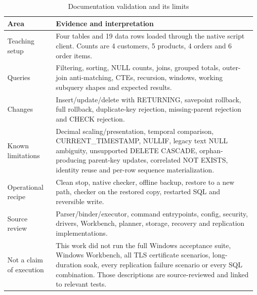\begin{longtable}{p{.29\linewidth}p{.63\linewidth}}
\caption{Documentation validation and its limits}\\
\toprule Area & Evidence and interpretation\\\midrule\endhead
Teaching setup & Four tables and 19 data rows loaded through the native script client. Counts are 4 customers, 5 products, 4 orders and 6 order items.\\
Queries & Filtering, sorting, NULL counts, joins, grouped totals, outer-join anti-matching, CTEs, recursion, windows, working subquery shapes and expected results.\\
Changes & Insert/update/delete with RETURNING, savepoint rollback, full rollback, duplicate-key rejection, missing-parent rejection and CHECK rejection.\\
Known limitations & Decimal scaling/presentation, temporal comparison, CURRENT\_TIMESTAMP, NULLIF, legacy text NULL ambiguity, unsupported DELETE CASCADE, orphan-producing parent-key updates, correlated NOT EXISTS, identity reuse and per-row sequence materialization.\\
Operational recipe & Clean stop, native checker, offline backup, restore to a new path, checker on the restored copy, restarted SQL and reversible write.\\
Source review & Parser/binder/executor, command entrypoints, config, security, drivers, Workbench, planner, storage, recovery and replication implementations.\\
Not a claim of execution & This work did not run the full Windows acceptance suite, Windows Workbench, all TLS certificate scenarios, long-duration soak, every replication failure scenario or every SQL combination. Those descriptions are source-reviewed and linked to relevant tests.\\\bottomrule
\end{longtable}


